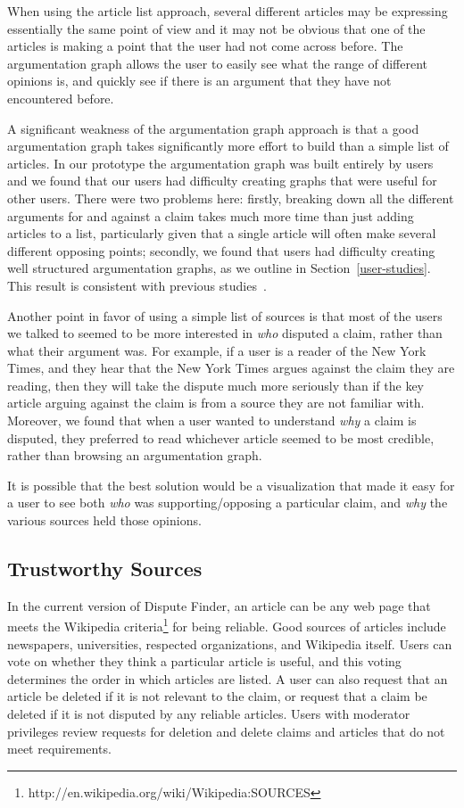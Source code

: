 \documentclass{www2010-submission}
\newcommand{\todo}[1]{}
\begin{document}
\todo{Call them supporting pages? Naming is a mess right now.}

When using the article list approach, several different articles may be expressing essentially the same point of view and it may not be obvious that one of the articles is making a point that the user had not come across before. The argumentation graph allows the user to easily see what the range of different opinions is, and quickly see if there is an argument that they have not encountered before. 

A significant weakness of the argumentation graph approach is that a good argumentation graph takes significantly more effort to build than a simple list of articles. In our prototype the argumentation graph was built entirely by users and we found that our users had difficulty creating graphs that were useful for other users. There were two problems here: firstly, breaking down all the different arguments for and against a claim takes much more time than just adding articles to a list, particularly given that a single article will often make several different opposing points; secondly, we found that users had difficulty creating well structured argumentation graphs, as we outline in Section~\ref{user-studies}. This result is consistent with previous studies~\cite{Isenmann1997}.

Another point in favor of using a simple list of sources is that most of the users we talked to seemed to be more interested in {\it who} disputed a claim, rather than what their argument was. For example, if a user is a reader of the New York Times, and they hear that the New York Times argues against the claim they are reading, then they will take the dispute much more seriously than if the key article arguing against the claim is from a source they are not familiar with. Moreover, we found that when a user wanted to understand {\it why} a claim is disputed, they preferred to read whichever article seemed to be most credible, rather than browsing an argumentation graph.

It is possible that the best solution would be a visualization that made it easy for a user to see both {\it who} was supporting/opposing a particular claim, and {\it why} the various sources held those opinions.


\subsection{Trustworthy Sources}

In the current version of Dispute Finder, an article can be any web page that meets the Wikipedia criteria\footnote{http://en.wikipedia.org/wiki/Wikipedia:SOURCES} for being reliable. Good sources of articles include newspapers, universities, respected organizations, and Wikipedia itself. Users can vote on whether they think a particular article is useful, and this voting determines the order in which articles are listed. A user can also request that an article be deleted if it is not relevant to the claim, or request that a claim be deleted if it is not disputed by any reliable articles. Users with moderator privileges review requests for deletion and delete claims and articles that do not meet requirements.
\end{document}
